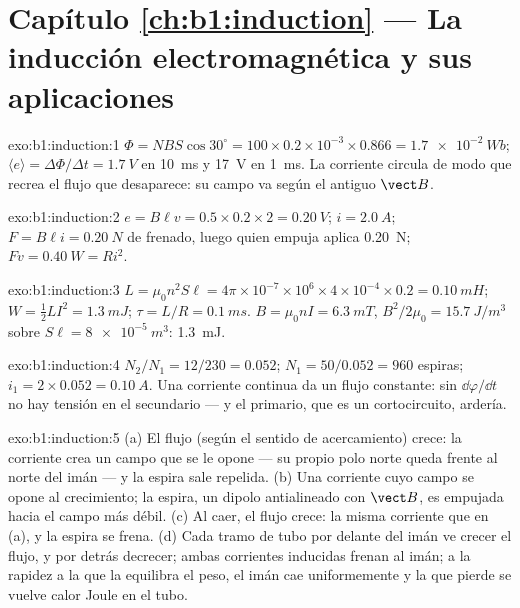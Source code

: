 \section*{Capítulo \ref{ch:b1:induction} --- La inducción electromagnética y sus aplicaciones}

\begin{solution}{exo:b1:induction:1}
$\Phi = NBS\cos30^\circ = 100 \times 0.2 \times 10^{-3} \times 0.866 = \qty{1.7e-2}{Wb}$;
$\langle e\rangle = \Delta\Phi/\Delta t = \qty{1.7}{V}$ en \qty{10}{ms} y \qty{17}{V} en
\qty{1}{ms}. La corriente circula de modo que recrea el flujo que
desaparece: su campo va según el antiguo $\vect B$.
\end{solution}

\begin{solution}{exo:b1:induction:2}
$e = B\ell v = 0.5 \times 0.2 \times 2 = \qty{0.20}{V}$; $i = \qty{2.0}{A}$; $F = B\ell i =
\qty{0.20}{N}$ de frenado, luego quien empuja aplica \qty{0.20}{N}; $Fv = \qty{0.40}{W}
= Ri^2$.
\end{solution}

\begin{solution}{exo:b1:induction:3}
$L = \mu_0n^2S\ell = 4\pi \times 10^{-7} \times 10^6 \times 4 \times 10^{-4} \times 0.2 =
\qty{0.10}{mH}$; $W = \tfrac12LI^2 = \qty{1.3}{mJ}$; $\tau = L/R = \qty{0.1}{ms}$.
$B = \mu_0nI = \qty{6.3}{mT}$, $B^2/2\mu_0 = \qty{15.7}{J/m^3}$ sobre
$S\ell = \qty{8e-5}{m^3}$: \qty{1.3}{mJ}.
\end{solution}

\begin{solution}{exo:b1:induction:4}
$N_2/N_1 = 12/230 = 0.052$; $N_1 = 50/0.052 = 960$ espiras; $i_1 = 2 \times 0.052 =
\qty{0.10}{A}$. Una corriente continua da un flujo constante: sin $\dd\varphi/\dd t$ no hay
tensión en el secundario --- y el primario, que es un cortocircuito, ardería.
\end{solution}

\begin{solution}{exo:b1:induction:5}
(a) El flujo (según el sentido de acercamiento) crece: la corriente crea
un campo que se le opone --- su propio polo norte queda frente al norte
del imán --- y la espira sale repelida. (b) Una corriente cuyo campo se
opone al crecimiento; la espira, un dipolo antialineado con $\vect B$, es
empujada hacia el campo más débil. (c) Al caer, el flujo crece: la misma
corriente que en (a), y la espira se frena. (d) Cada tramo de tubo por
delante del imán ve crecer el flujo, y por detrás decrecer; ambas
corrientes inducidas frenan al imán; a la rapidez a la que la  equilibra el peso, el imán cae uniformemente y la  que pierde se vuelve calor Joule en el tubo.
\end{solution}

